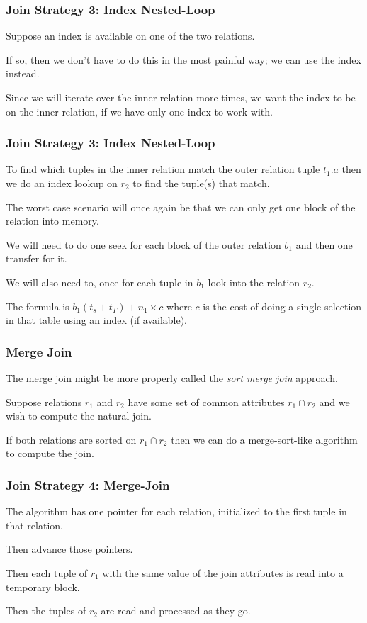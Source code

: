\begin{frame}
\frametitle{Join Strategy 3: Index Nested-Loop}

Suppose an index is available on one of the two relations. 

If so, then we don't have to do this in the most painful way; we can use the index instead.

 Since we will iterate over the inner relation more times, we want the index to be on the inner relation, if we have only one index to work with.

\end{frame}

\begin{frame}
\frametitle{Join Strategy 3: Index Nested-Loop}

To find which tuples in the inner relation match the outer relation tuple $t_{1}.a$ then we do an index lookup on $r_{2}$ to find the tuple(s) that match. 

The worst case scenario will once again be that we can only get one block of the relation into memory. 

We will need to do one seek for each block of the outer relation $b_{1}$ and then one transfer for it. 

We will also need to, once for each tuple in $b_{1}$ look into the relation $r_{2}$. 

The formula is $b_{1} ( t_{s} + t_{T} ) + n_{1} \times c$  where $c$ is the cost of doing a single selection in that table using an index (if available).

\end{frame}

\begin{frame}
\frametitle{Merge Join}

The merge join might be more properly called the \textit{sort merge join} approach. 

Suppose relations $r_{1}$ and $r_{2}$ have some set of common attributes $r_{1} \cap r_{2}$ and we wish to compute the natural join. 

If both relations are sorted on  $r_{1} \cap r_{2}$ then we can do a merge-sort-like algorithm to compute the join.

\end{frame}


\begin{frame}
\frametitle{Join Strategy 4: Merge-Join}

The algorithm has one pointer for each relation, initialized to the first tuple in that relation. 

Then advance those pointers. 

Then each tuple of $r_{1}$ with the same value of the join attributes is read into a temporary block. 

Then the tuples of $r_{2}$ are read and processed as they go.

\end{frame}


